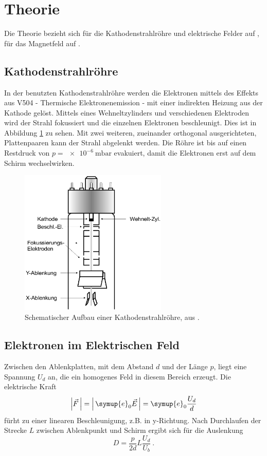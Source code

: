 \section{Theorie}
\label{sec:theorie}
Die Theorie bezieht sich für die Kathodenstrahlröhre und elektrische Felder
auf \cite{Anleitung501}, für das Magnetfeld auf \cite{Anleitung502}.
\subsection{Kathodenstrahlröhre}
In der benutzten Kathodenstrahlröhre werden die Elektronen mittels des Effekts
aus V504 - Thermische Elektronenemission - mit einer indirekten Heizung aus der
Kathode gelöst.
Mittels eines Wehneltzylinders und verschiedenen Elektroden wird der Strahl
fokussiert und die einzelnen Elektronen beschleunigt.
Dies ist in Abbildung \ref{fig:kathstrahl} zu sehen. Mit zwei weiteren,
zueinander orthogonal ausgerichteten, Plattenpaaren kann der Strahl abgelenkt werden.
Die Röhre ist bis auf einen Restdruck von $p=\SI{e-6}{\milli\bar}$ evakuiert,
damit die Elektronen erst auf dem Schirm wechselwirken.

\begin{figure}
  \centering
  \includegraphics[width=7cm]{content/kathodenstrahl2.png}
  \caption{Schematischer Aufbau einer Kathodenstrahlröhre, aus \cite{Anleitung501}.}
  \label{fig:kathstrahl}
\end{figure}

\subsection{Elektronen im Elektrischen Feld}
Zwischen den Ablenkplatten, mit dem Abstand $d$ und der Länge $p$,
liegt eine Spannung $U_d$ an, die ein homogenes Feld in diesem Bereich erzeugt.
Die elektrische Kraft
\begin{equation}
      \left|\vec{F}\,\right| = \left|\,\symup{e}_0\vec{E}\,\right| = \symup{e}_0\frac{U_d}{d}
\end{equation}
fürht zu einer linearen Beschleunigung, z.B. in y-Richtung.
Nach Durchlaufen der Strecke $L$ zwischen Ablenkpunkt und Schirm ergibt sich
für die Auslenkung
\begin{equation}
      D = \frac{p}{2d}L\frac{U_d}{U_b}\:.
      \label{eqn:ablenkunge}
\end{equation}

